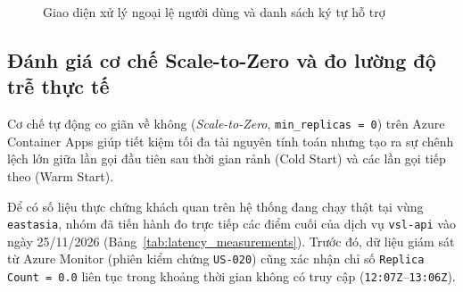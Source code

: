 \begin{figure}[H]
\centering
{}
\caption{Giao diện xử lý ngoại lệ người dùng và danh sách ký tự hỗ trợ}
\label{fig:web_error_and_guide}
\end{figure}

\subsection{Đánh giá cơ chế Scale-to-Zero và đo lường độ trễ thực tế}
\label{subsec:do_cold_start}

Cơ chế tự động co giãn về không (\textit{Scale-to-Zero}, \texttt{min\_replicas = 0}) trên Azure Container Apps giúp tiết kiệm tối đa tài nguyên tính toán nhưng tạo ra sự chênh lệch lớn giữa lần gọi đầu tiên sau thời gian rảnh (Cold Start) và các lần gọi tiếp theo (Warm Start).

Để có số liệu thực chứng khách quan trên hệ thống đang chạy thật tại vùng \texttt{eastasia}, nhóm đã tiến hành đo trực tiếp các điểm cuối của dịch vụ \texttt{vsl-api} vào ngày 25/11/2026 (Bảng~\ref{tab:latency_measurements}). Trước đó, dữ liệu giám sát từ Azure Monitor (phiên kiểm chứng \texttt{US-020}) cũng xác nhận chỉ số \texttt{Replica Count = 0.0} liên tục trong khoảng thời gian không có truy cập (\texttt{12:07Z}--\texttt{13:06Z}).

